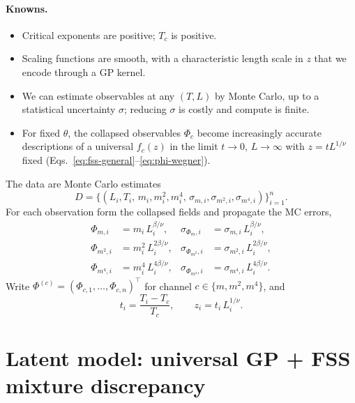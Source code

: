 \documentclass[11pt]{article}
\begin{document}
\paragraph{Knowns.}
\begin{itemize}
  \item Critical exponents are positive; $T_c$ is positive.
  \item Scaling functions are smooth, with a characteristic length scale
    in $z$ that we encode through a GP kernel.
  \item We can estimate observables at any $(T,L)$ by Monte Carlo, up to
    a statistical uncertainty $\sigma$; reducing $\sigma$ is costly and
    compute is finite.
  \item For fixed $\theta$, the collapsed observables $\Phi_c$ become
    increasingly accurate descriptions of a universal $f_c(z)$ in the
    limit $t\to 0$, $L\to\infty$ with $z = t L^{1/\nu}$ fixed
    (Eqs.~\eqref{eq:fss-general}--\eqref{eq:phi-wegner}).
\end{itemize}

The data are Monte Carlo estimates
\[
  D
  = \bigl\{
      (L_i,T_i,\, m_i,m^2_i,m^4_i,\,
       \sigma_{m,i},\sigma_{m^2,i},\sigma_{m^4,i})
    \bigr\}_{i=1}^{n}.
\]
For each observation form the collapsed fields and propagate the MC
errors,
\begin{align}
  \Phi_{m,i}
    &= m_i\, L_i^{\beta/\nu},
  &
  \sigma_{\Phi_m,i}
    &= \sigma_{m,i}\, L_i^{\beta/\nu},
  \\
  \Phi_{m^2,i}
    &= m^2_i\, L_i^{2\beta/\nu},
  &
  \sigma_{\Phi_{m^2},i}
    &= \sigma_{m^2,i}\, L_i^{2\beta/\nu},
  \\
  \Phi_{m^4,i}
    &= m^4_i\, L_i^{4\beta/\nu},
  &
  \sigma_{\Phi_{m^4},i}
    &= \sigma_{m^4,i}\, L_i^{4\beta/\nu}.
\end{align}
Write $\Phi^{(c)} = (\Phi_{c,1},\ldots,\Phi_{c,n})^\top$ for channel
$c\in\{m,m^2,m^4\}$, and
\begin{equation}
  t_i = \frac{T_i - T_c}{T_c},
  \qquad
  z_i = t_i\, L_i^{1/\nu}.
\end{equation}

\section{Latent model: universal GP + FSS mixture discrepancy}
\end{document}
